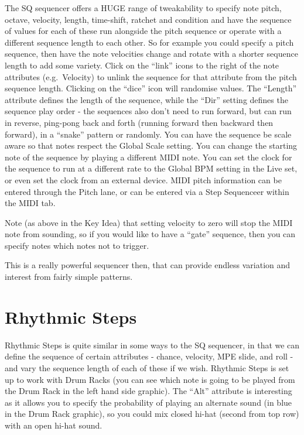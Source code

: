 \documentclass[
  12pt,
  letterpaper,
  oneside,
  open=any]{scrbook}
\makeatletter
\newcommand*\pandocbounded[1]{%
  \sbox\pandoc@box{#1}%
  \Gscale@div\@tempa{\textheight}{\dimexpr\ht\pandoc@box+\dp\pandoc@box\relax}%
  \Gscale@div\@tempb{\linewidth}{\wd\pandoc@box}%
  \ifdim\@tempb\p@<\@tempa\p@\let\@tempa\@tempb\fi%
  \ifdim\@tempa\p@<\p@\scalebox{\@tempa}{\usebox\pandoc@box}%
  \else\usebox{\pandoc@box}%
  \fi%
}
\makeatother
\begin{document}
The SQ sequencer offers a HUGE range of tweakability to specify note
pitch, octave, velocity, length, time-shift, ratchet and condition and
have the sequence of values for each of these run alongside the pitch
sequence or operate with a different sequence length to each other. So
for example you could specify a pitch sequence, then have the note
velocities change and rotate with a shorter sequence length to add some
variety. Click on the ``link'' icons to the right of the note attributes
(e.g.~Velocity) to unlink the sequence for that attribute from the pitch
sequence length. Clicking on the ``dice'' icon will randomise values.
The ``Length'' attribute defines the length of the sequence, while the
``Dir'' setting defines the sequence play order - the sequences also
don't need to run forward, but can run in reverse, ping-pong back and
forth (running forward then backward then forward), in a ``snake''
pattern or randomly. You can have the sequence be scale aware so that
notes respect the Global Scale setting. You can change the starting note
of the sequence by playing a different MIDI note. You can set the clock
for the sequence to run at a different rate to the Global BPM setting in
the Live set, or even set the clock from an external device. MIDI pitch
information can be entered through the Pitch lane, or can be entered via
a Step Sequenceer within the MIDI tab.

Note (as above in the Key Idea) that setting velocity to zero will stop
the MIDI note from sounding, so if you would like to have a ``gate''
sequence, then you can specify notes which notes not to trigger.

\pandocbounded{\texttt{[image: images/Live12\_SQ.png]}}

This is a really powerful sequencer then, that can provide endless
variation and interest from fairly simple patterns.

\section{Rhythmic Steps}\label{rhythmic-steps}

Rhythmic Steps is quite similar in some ways to the SQ sequencer, in
that we can define the sequence of certain attributes - chance,
velocity, MPE slide, and roll - and vary the sequence length of each of
these if we wish. Rhythmic Steps is set up to work with Drum Racks (you
can see which note is going to be played from the Drum Rack in the left
hand side graphic). The ``Alt'' attribute is interesting as it allows
you to specify the probability of playing an alternate sound (in blue in
the Drum Rack graphic), so you could mix closed hi-hat (second from top
row) with an open hi-hat sound.
\end{document}
